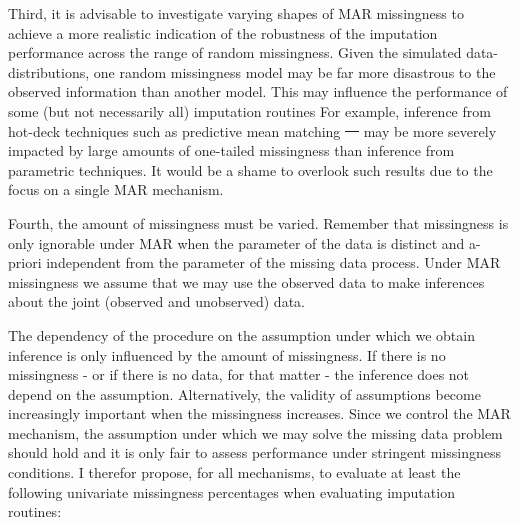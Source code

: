 \documentclass[ %
]{article} %
\providecommand{\DIFaddtex}[1]{{\protect\color{blue}\uwave{#1}}} %
\providecommand{\DIFdeltex}[1]{{\protect\color{red}\sout{#1}}}                      %
\providecommand{\DIFaddbegin}{} %
\providecommand{\DIFaddend}{} %
\providecommand{\DIFdelbegin}{} %
\providecommand{\DIFdelend}{} %
\providecommand{\DIFadd}[1]{\texorpdfstring{\DIFaddtex{#1}}{#1}} %
\providecommand{\DIFdel}[1]{\texorpdfstring{\DIFdeltex{#1}}{}} %
\newcommand{\DIFscaledelfig}{0.5}
\newlength{\DIFdelgraphicswidth} %
\newlength{\DIFdelgraphicsheight} %
\newcommand{\DIFaddincludegraphics}[2][]{{\color{blue}\fbox{\DIFOincludegraphics[#1]{#2}}}} %
\newcommand{\DIFdelincludegraphics}[2][]{%
\sbox{\DIFdelgraphicsbox}{\DIFOincludegraphics[#1]{#2}}%
\settoboxwidth{\DIFdelgraphicswidth}{\DIFdelgraphicsbox} %
\settoboxtotalheight{\DIFdelgraphicsheight}{\DIFdelgraphicsbox} %
\scalebox{\DIFscaledelfig}{%
\parbox[b]{\DIFdelgraphicswidth}{\usebox{\DIFdelgraphicsbox}\\[-\baselineskip] \rule{\DIFdelgraphicswidth}{0em}}\llap{\resizebox{\DIFdelgraphicswidth}{\DIFdelgraphicsheight}{%
\setlength{\unitlength}{\DIFdelgraphicswidth}%
\begin{picture}(1,1)%
\thicklines\linethickness{2pt} %
{\color[rgb]{1,0,0}\put(0,0){\framebox(1,1){}}}%
{\color[rgb]{1,0,0}\put(0,0){\line( 1,1){1}}}%
{\color[rgb]{1,0,0}\put(0,1){\line(1,-1){1}}}%
\end{picture}%
}\hspace*{3pt}}} %
} %
\DeclareRobustCommand{\DIFaddbegin}{\DIFOaddbegin \let\includegraphics\DIFaddincludegraphics} %
\DeclareRobustCommand{\DIFaddend}{\DIFOaddend \let\includegraphics\DIFOincludegraphics} %
\DeclareRobustCommand{\DIFdelbegin}{\DIFOdelbegin \let\includegraphics\DIFdelincludegraphics} %
\DeclareRobustCommand{\DIFdelend}{\DIFOaddend \let\includegraphics\DIFOincludegraphics} %
\begin{document}
\DIFaddend Third, it is advisable to investigate varying shapes of MAR missingness
to achieve a more realistic indication of the robustness of the
imputation performance across the range of random missingness. Given the
simulated data-distributions, one random missingness model may be far
more disastrous to the observed information than another model. This may
influence the performance of some (but not necessarily all) imputation
routines For example, inference from hot-deck techniques such as
predictive mean matching \DIFdelbegin \DIFdel{\mbox{%
\citep{little1988missing, rubin1986statistical} }\hspace{0pt}%
}\DIFdelend \DIFaddbegin \DIFadd{(Roderick JA Little 1988; Donald B. Rubin 1986)
}\DIFaddend may be more severely impacted by large amounts of one-tailed missingness
than inference from parametric techniques. It would be a shame to
overlook such results due to the focus on a single MAR mechanism.

Fourth, the amount of missingness must be varied. Remember that
missingness is only ignorable under MAR when the parameter of the data
is distinct and a-priori independent from the parameter of the missing
data process. Under MAR missingness we assume that we may use the
observed data to make inferences about the joint (observed and
unobserved) data.

The dependency of the procedure on the assumption under which we obtain
inference is only influenced by the amount of missingness. If there is
no missingness - or if there is no data, for that matter - the inference
does not depend on the assumption. Alternatively, the validity of
assumptions become increasingly important when the missingness
increases. Since we control the MAR mechanism, the assumption under
which we may solve the missing data problem should hold and it is only
fair to assess performance under stringent missingness conditions. I
therefor propose, for all mechanisms, to evaluate at least the following
univariate missingness percentages when evaluating imputation routines:
\end{document}
